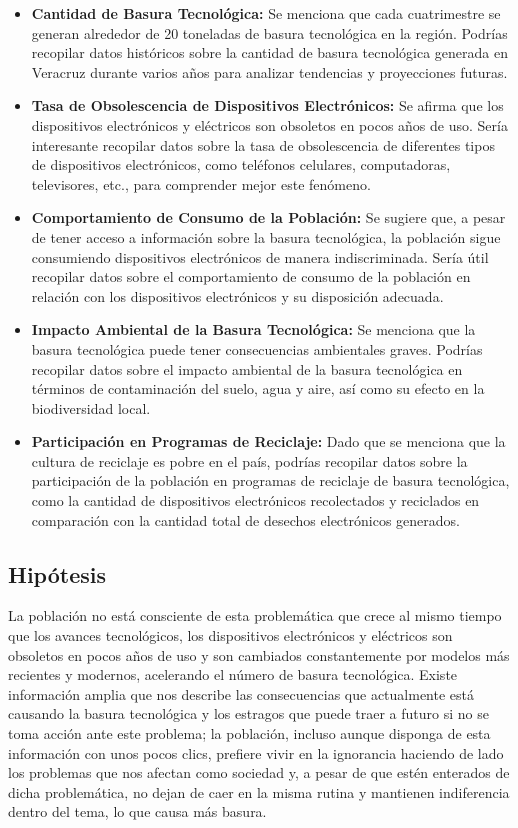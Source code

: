 \documentclass[letterpaper,12pt]{article}
\begin{document}
\begin{sloppypar}
\begin{itemize}
    \item \textbf{Cantidad de Basura Tecnológica:} Se menciona que cada cuatrimestre se generan alrededor de 20 toneladas de basura tecnológica en la región. Podrías recopilar datos históricos sobre la cantidad de basura tecnológica generada en Veracruz durante varios años para analizar tendencias y proyecciones futuras.
    \item \textbf{Tasa de Obsolescencia de Dispositivos Electrónicos:} Se afirma que los dispositivos electrónicos y eléctricos son obsoletos en pocos años de uso. Sería interesante recopilar datos sobre la tasa de obsolescencia de diferentes tipos de dispositivos electrónicos, como teléfonos celulares, computadoras, televisores, etc., para comprender mejor este fenómeno.
    \item \textbf{Comportamiento de Consumo de la Población:} Se sugiere que, a pesar de tener acceso a información sobre la basura tecnológica, la población sigue consumiendo dispositivos electrónicos de manera indiscriminada. Sería útil recopilar datos sobre el comportamiento de consumo de la población en relación con los dispositivos electrónicos y su disposición adecuada.
    \item \textbf{Impacto Ambiental de la Basura Tecnológica:} Se menciona que la basura tecnológica puede tener consecuencias ambientales graves. Podrías recopilar datos sobre el impacto ambiental de la basura tecnológica en términos de contaminación del suelo, agua y aire, así como su efecto en la biodiversidad local.
    \item \textbf{Participación en Programas de Reciclaje:} Dado que se menciona que la cultura de reciclaje es pobre en el país, podrías recopilar datos sobre la participación de la población en programas de reciclaje de basura tecnológica, como la cantidad de dispositivos electrónicos recolectados y reciclados en comparación con la cantidad total de desechos electrónicos generados.
\end{itemize}
\subsection{Hipótesis}
La población no está consciente de esta problemática que crece al mismo tiempo que los avances tecnológicos, los dispositivos electrónicos y eléctricos son obsoletos en pocos años de uso y son cambiados constantemente por modelos más recientes y modernos, acelerando el número de basura tecnológica. Existe información amplia que nos describe las consecuencias que actualmente está causando la basura tecnológica y los estragos que puede traer a futuro si no se toma acción ante este problema; la población, incluso aunque disponga de esta información con unos pocos clics, prefiere vivir en la ignorancia haciendo de lado los problemas que nos afectan como sociedad y, a pesar de que estén enterados de dicha problemática, no dejan de caer en la misma rutina y mantienen indiferencia dentro del tema, lo que causa más basura.
\newpage

\end{sloppypar}
\end{document}
